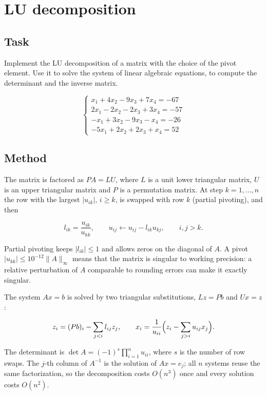 \section{LU decomposition}

\subsection{Task}

Implement the LU decomposition of a matrix with the choice of the pivot element. Use it to solve
the system of linear algebraic equations, to compute the determinant and the inverse matrix.

\[
\begin{cases}
x_1 + 4x_2 - 9x_3 + 7x_4 = -67 \\
2x_1 - 2x_2 - 2x_3 + 3x_4 = -57 \\
-x_1 + 3x_2 - 9x_3 - x_4 = -26 \\
-5x_1 + 2x_2 + 2x_3 + x_4 = 52
\end{cases}
\]

\subsection{Method}

The matrix is factored as $PA = LU$, where $L$ is a unit lower triangular matrix, $U$ is an upper
triangular matrix and $P$ is a permutation matrix. At step $k = 1, \ldots, n$ the row with the
largest $|u_{ik}|$, $i \ge k$, is swapped with row $k$ (partial pivoting), and then

\[
l_{ik} = \frac{u_{ik}}{u_{kk}}, \qquad u_{ij} \leftarrow u_{ij} - l_{ik} u_{kj},
\qquad i, j > k.
\]

Partial pivoting keeps $|l_{ik}| \le 1$ and allows zeros on the diagonal of $A$. A pivot
$|u_{kk}| \le 10^{-12}\|A\|_\infty$ means that the matrix is singular to working precision: a
relative perturbation of $A$ comparable to rounding errors can make it exactly singular.

The system $Ax = b$ is solved by two triangular substitutions, $Lz = Pb$ and $Ux = z$:

\[
z_i = (Pb)_i - \sum_{j<i} l_{ij} z_j, \qquad
x_i = \frac{1}{u_{ii}} \Bigl(z_i - \sum_{j>i} u_{ij} x_j\Bigr).
\]

The determinant is $\det A = (-1)^s \prod_{i=1}^n u_{ii}$, where $s$ is the number of row swaps.
The $j$-th column of $A^{-1}$ is the solution of $Ax = e_j$; all $n$ systems reuse the same
factorization, so the decomposition costs $O(n^3)$ once and every solution costs $O(n^2)$.

